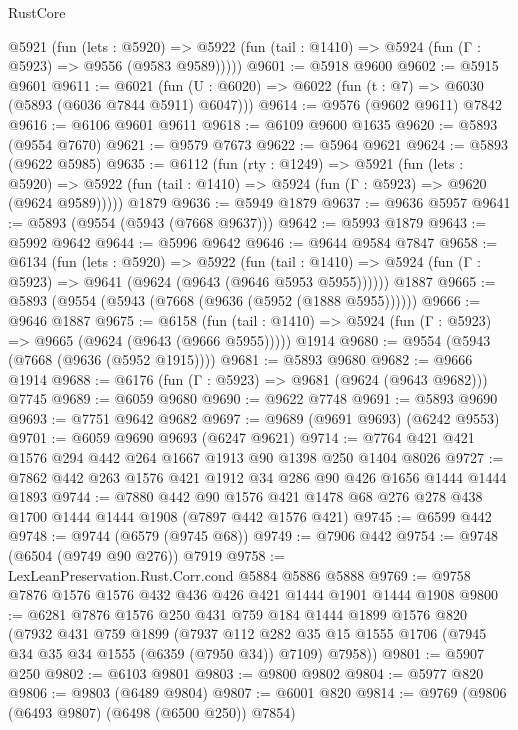 \begin{lexlean}{RustCore}
\begin{coremodule}
    @5921
      (fun (lets : @5920) =>
      @5922 (fun (tail : @1410) => @5924 (fun (Γ : @5923) => @9556 (@9583 @9589)))))
@9601 := @5918 @9600
@9602 := @5915 @9601
@9611 := @6021 (fun (U : @6020) => @6022 (fun (t : @7) => @6030 (@5893 (@6036 @7844 @5911) @6047)))
@9614 := @9576 (@9602 @9611) @7842
@9616 := @6106 @9601 @9611
@9618 := @6109 @9600 @1635
@9620 := @5893 (@9554 @7670)
@9621 := @9579 @7673
@9622 := @5964 @9621
@9624 := @5893 (@9622 @5985)
@9635 := @6112
    (fun (rty : @1249) =>
    @5921
      (fun (lets : @5920) =>
      @5922 (fun (tail : @1410) => @5924 (fun (Γ : @5923) => @9620 (@9624 @9589)))))
    @1879
@9636 := @5949 @1879
@9637 := @9636 @5957
@9641 := @5893 (@9554 (@5943 (@7668 @9637)))
@9642 := @5993 @1879
@9643 := @5992 @9642
@9644 := @5996 @9642
@9646 := @9644 @9584 @7847
@9658 := @6134
    (fun (lets : @5920) =>
    @5922
      (fun (tail : @1410) => @5924 (fun (Γ : @5923) => @9641 (@9624 (@9643 (@9646 @5953 @5955))))))
    @1887
@9665 := @5893 (@9554 (@5943 (@7668 (@9636 (@5952 (@1888 @5955))))))
@9666 := @9646 @1887
@9675 := @6158
    (fun (tail : @1410) => @5924 (fun (Γ : @5923) => @9665 (@9624 (@9643 (@9666 @5955)))))
    @1914
@9680 := @9554 (@5943 (@7668 (@9636 (@5952 @1915))))
@9681 := @5893 @9680
@9682 := @9666 @1914
@9688 := @6176 (fun (Γ : @5923) => @9681 (@9624 (@9643 @9682))) @7745
@9689 := @6059 @9680
@9690 := @9622 @7748
@9691 := @5893 @9690
@9693 := @7751 @9642 @9682
@9697 := @9689 (@9691 @9693) (@6242 @9553)
@9701 := @6059 @9690 @9693 (@6247 @9621)
@9714 := @7764 @421 @421 @1576 @294 @442 @264 @1667 @1913 @90 @1398 @250 @1404 @8026
@9727 := @7862 @442 @263 @1576 @421 @1912 @34 @286 @90 @426 @1656 @1444 @1444 @1893
@9744 := @7880
    @442
    @90
    @1576
    @421
    @1478
    @68
    @276
    @278
    @438
    @1700
    @1444
    @1444
    @1908
    (@7897 @442 @1576 @421)
@9745 := @6599 @442
@9748 := @9744 (@6579 (@9745 @68))
@9749 := @7906 @442
@9754 := @9748 (@6504 (@9749 @90 @276)) @7919
@9758 := LexLeanPreservation.Rust.Corr.cond @5884 @5886 @5888
@9769 := @9758 @7876 @1576 @1576 @432 @436 @426 @421 @1444 @1901 @1444 @1908
@9800 := @6281
    @7876
    @1576
    @250
    @431
    @759
    @184
    @1444
    @1899
    @1576
    @820
    (@7932
      @431
      @759
      @1899
      (@7937
        @112
        @282
        @35
        @15
        @1555
        @1706
        (@7945 @34 @35 @34 @1555 (@6359 (@7950 @34)) @7109)
        @7958))
@9801 := @5907 @250
@9802 := @6103 @9801
@9803 := @9800 @9802
@9804 := @5977 @820
@9806 := @9803 (@6489 @9804)
@9807 := @6001 @820
@9814 := @9769 (@9806 (@6493 @9807) (@6498 (@6500 @250)) @7854)

\end{coremodule}
\end{lexlean}
